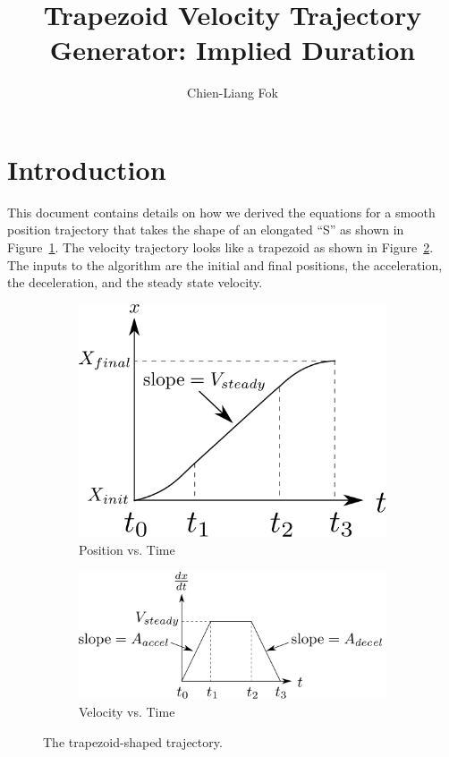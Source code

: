 \documentclass[11pt]{article} %
\title{Trapezoid Velocity Trajectory Generator: Implied Duration}
\author{Chien-Liang Fok}
\begin{document}
\maketitle

\section{Introduction}

This document contains details on how we derived the equations for a smooth position trajectory that takes the shape of an elongated ``S'' as shown in Figure~\ref{fig:position_vs_time}. The velocity trajectory looks like a trapezoid as shown in Figure~\ref{fig:velocity_vs_time}. The inputs to the algorithm are the initial and final positions, the acceleration, the deceleration, and the steady state velocity.

\begin{figure}[tbh]
    \centering
    \begin{subfigure}[b]{0.35\textwidth}
        \centering
        \includegraphics[width=\textwidth]{position_vs_time.png}
        \caption{Position vs. Time}
        \label{fig:position_vs_time}
    \end{subfigure}
    \hfill
    \begin{subfigure}[b]{0.575\textwidth}
        \centering
        \includegraphics[width=\textwidth]{velocity_vs_time.png}
        \caption{Velocity vs. Time}
        \label{fig:velocity_vs_time}
    \end{subfigure}
    \caption{The trapezoid-shaped trajectory.}
    \label{fig:trapezoid_trajectory}
\end{figure}
\end{document}

